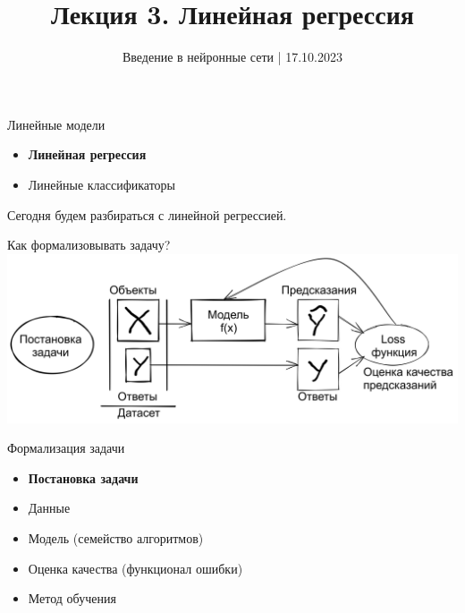 \documentclass[aspectratio=169]{beamer}
\title{Лекция 3. Линейная регрессия}
\date{Введение в нейронные сети | 17.10.2023}
\begin{document}
\maketitle

\begin{frame}{Линейные модели}
    \begin{itemize}
        \item \textbf{Линейная регрессия}
        \item Линейные классификаторы
    \end{itemize}

    Сегодня будем разбираться с линейной регрессией.
\end{frame}

\begin{frame}{Как формализовывать задачу?}
    \includegraphics[width=\linewidth]{figures/fig1.jpg}
\end{frame}

\begin{frame}{Формализация задачи}
    \begin{itemize}
        \item \textbf{Постановка задачи}
        \item Данные
        \item Модель (семейство алгоритмов)
        \item Оценка качества (функционал ошибки)
        \item Метод обучения
    \end{itemize}
\end{frame}
\end{document}
